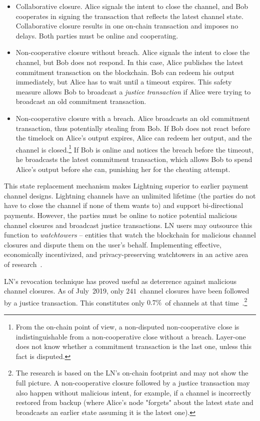 \begin{itemize}
	\item Collaborative closure. Alice signals the intent to close the channel, and Bob cooperates in signing the transaction that reflects the latest channel state. Collaborative closure results in one on-chain transaction and imposes no delays. Both parties must be online and cooperating.
	\item Non-cooperative closure without breach. Alice signals the intent to close the channel, but Bob does not respond. In this case, Alice publishes the latest commitment transaction on the blockchain. Bob can redeem his output immediately, but Alice has to wait until a timeout expires. This safety measure allows Bob to broadcast a \textit{justice transaction} if Alice were trying to broadcast an old commitment transaction.
	\item Non-cooperative closure with a breach. Alice broadcasts an old commitment transaction, thus potentially stealing from Bob. If Bob does not react before the timelock on Alice's output expires, Alice can redeem her output, and the channel is closed.\footnote{From the on-chain point of view, a non-disputed non-cooperative close is indistinguishable from a non-cooperative close without a breach. Layer-one does not know whether a commitment transaction is the last one, unless this fact is disputed.} If Bob is online and notices the breach before the timeout, he broadcasts the latest commitment transaction, which allows Bob to spend Alice's output before she can, punishing her for the cheating attempt.
\end{itemize}

This state replacement mechanism makes Lightning superior to earlier payment channel designs.
Lightning channels have an unlimited lifetime (the parties do not have to close the channel if none of them wants to) and support bi-directional payments.
However, the parties must be online to notice potential malicious channel closures and broadcast justice transactions.
LN users may outsource this function to \textit{watchtowers} -- entities that watch the blockchain for malicious channel closures and dispute them on the user's behalf.
Implementing effective, economically incentivized, and privacy-preserving watchtowers in an active area of research~\cite{McCorry2019}.

LN's revocation technique has proved useful as deterrence against malicious channel closures.
As of July~2019, only $241$~channel closures have been followed by a justice transaction.
This constitutes only $0.7\%$~of channels at that time~\cite{BitMEXLN3}.\footnote{The research is based on the LN's on-chain footprint and may not show the full picture. A non-cooperative closure followed by a justice transaction may also happen without malicious intent, for example, if a channel is incorrectly restored from backup (where Alice's node "forgets" about the latest state and broadcasts an earlier state assuming it is the latest one).}


